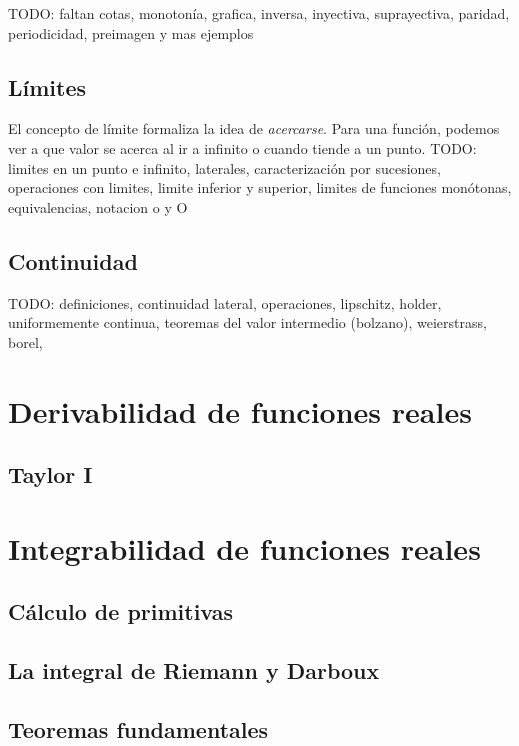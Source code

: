 \documentclass{article}
\begin{document}
TODO: faltan cotas, monotonía, grafica, inversa, inyectiva, suprayectiva, paridad, periodicidad, preimagen y mas ejemplos




\subsection{Límites}
El concepto de límite formaliza la idea de \textit{acercarse}. Para una función, podemos ver a que valor se acerca al ir a infinito o cuando tiende a un punto.
TODO: limites en un punto e infinito, laterales, caracterización por sucesiones, operaciones con limites, limite inferior y superior, limites de funciones monótonas, equivalencias, notacion o y O

\subsection{Continuidad}
TODO: definiciones, continuidad lateral, operaciones, lipschitz, holder, uniformemente continua, teoremas del valor intermedio (bolzano), weierstrass, borel, 


\section{Derivabilidad de funciones reales}
\subsection{Taylor I}





\section{Integrabilidad de funciones reales}

\subsection{Cálculo de primitivas}

\subsection{La integral de Riemann y Darboux}

\subsection{Teoremas fundamentales}
\end{document}
